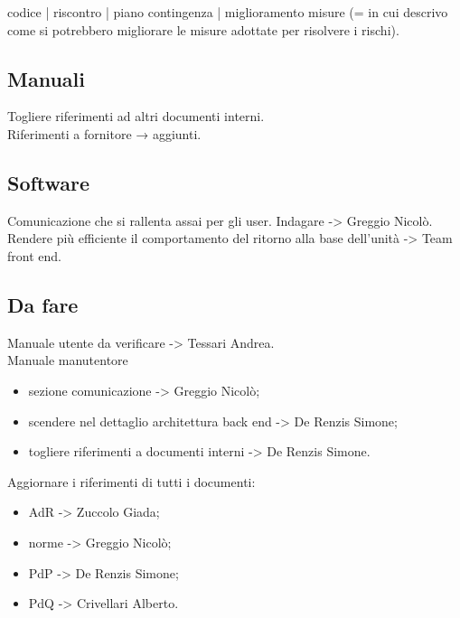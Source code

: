 codice | riscontro | piano contingenza | miglioramento misure (= in cui descrivo come si potrebbero migliorare le misure adottate per risolvere i rischi).

\subsection{Manuali}
Togliere riferimenti ad altri documenti interni.\\
Riferimenti a fornitore → aggiunti.

\subsection{Software}
Comunicazione che si rallenta assai per gli user. Indagare -> Greggio Nicolò.\\
Rendere più efficiente il comportamento del ritorno alla base dell'unità -> Team front end. 

\subsection{Da fare}
Manuale utente da verificare -> Tessari Andrea.\\
Manuale manutentore
\begin{itemize}
	\item sezione comunicazione -> Greggio Nicolò;
	\item scendere nel dettaglio architettura back end -> De Renzis Simone;
	\item togliere riferimenti a documenti interni -> De Renzis Simone.
\end{itemize}

Aggiornare i riferimenti di tutti i documenti:
\begin{itemize}
	\item AdR -> Zuccolo Giada;
	\item norme -> Greggio Nicolò;
	\item PdP -> De Renzis Simone;
	\item PdQ -> Crivellari Alberto.
\end{itemize}





